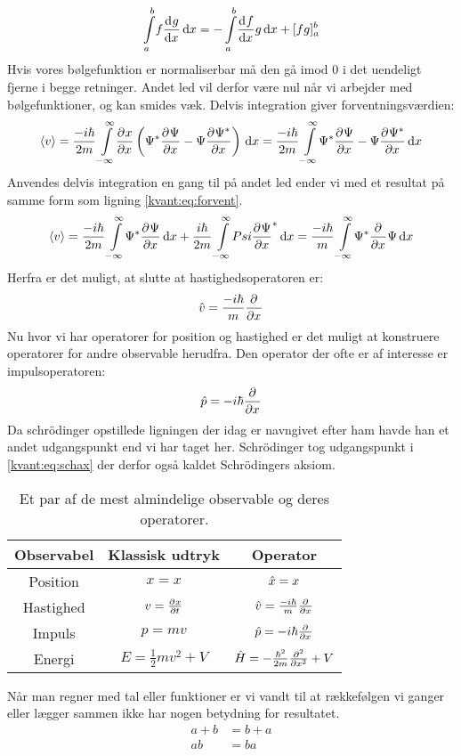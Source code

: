 \documentclass[../Kvantemekanik.tex]{subfiles}
\begin{document}
$$
\integral{f\dif{x}{g}}{x}{a}{b} = -\integral{\dif{x}{f}g}{x}{a}{b}+[fg]_a^b
$$
Hvis vores bølgefunktion er normaliserbar må den gå imod 0 i det uendeligt fjerne i begge retninger. Andet led vil derfor være nul når vi arbejder med bølgefunktioner, og kan smides væk. 
Delvis integration giver forventningsværdien:
$$
\expect v = \frac{-i\hbar}{2m}\integral{\pdif{x}{x}
\left(\Psi^*\pdif{x}{\Psi}-\Psi\pdif{x}{\Psi^*}\right)
}{x}{-\infty}{\infty}=
\frac{-i\hbar}{2m}\integral{
\Psi^*\pdif{x}{\Psi}-\Psi\pdif{x}{\Psi^*}
}{x}{-\infty}{\infty}
$$
Anvendes delvis integration en gang til på andet led ender vi med et resultat på samme form som ligning \eqref{kvant:eq:forvent}.
$$
\expect v = \frac{-i\hbar}{2m}\integral{\Psi^*\pdif{x}\Psi}{x}{-\infty}{\infty}+\frac{i\hbar}{2m}\integral{Psi\pdif{x}\Psi^*}{x}{-\infty}{\infty} = \frac{-i\hbar}{m}\integral{\Psi^*\pdif{x}{}\Psi}{x}{-\infty}{\infty}
$$
Herfra er det muligt, at slutte at hastighedsoperatoren er:
\begin{equation}
\op v = \frac{-i\hbar}{m}\pdif{x}{}
\end{equation}
Nu hvor vi har operatorer for position og hastighed er det muligt at konstruere operatorer for andre observable herudfra. Den operator der ofte er af interesse er impulsoperatoren:
\begin{equation}
    \op p = -i\hbar \pdif{x}{}\label{kvant:eq:scrax}
\end{equation}
Da schrödinger opstillede ligningen der idag er navngivet efter ham havde han et andet udgangspunkt end vi har taget her. Schrödinger tog udgangspunkt i \eqref{kvant:eq:schax} der derfor også kaldet Schrödingers aksiom.
\begin{table}[h]
\center
\begin{tabular}{c|c|c}
Observabel & Klassisk udtryk & Operator \\\hline
Position & $x=x$ & $\op x = x$\\
Hastighed & $v = \pdif{t}{x}$ & $\op v = \frac{-i\hbar}{m}\pdif{x}{}$\\
Impuls & $p = mv$ & $\op p = -i\hbar\pdif{x}{}$\\
Energi & $E=\frac{1}{2}mv^2+V$ & $\op H = -\frac{\hbar^2}{2m}\pdif[2]{x}{}+V$
\end{tabular}
\caption{Et par af de mest almindelige observable og deres operatorer.}
\end{table}
Når man regner med tal eller funktioner er vi vandt til at rækkefølgen vi ganger eller lægger sammen ikke har nogen betydning for resultatet.
\begin{align*}
a+b&=b+a\\
ab &= ba
\end{align*}
\end{document}
